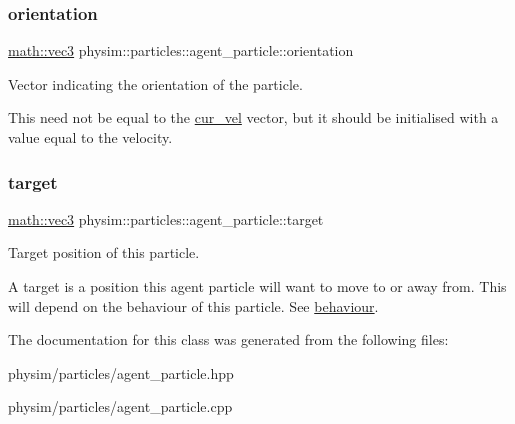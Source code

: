 \subsubsection{\texorpdfstring{orientation}{orientation}}
{\footnotesize\ttfamily \hyperlink{structphysim_1_1math_1_1vec3}{math\+::vec3} physim\+::particles\+::agent\+\_\+particle\+::orientation}



Vector indicating the orientation of the particle. 

This need not be equal to the \hyperlink{classphysim_1_1particles_1_1base__particle_a66a164d2a130c40901e3ec2709cdad43}{cur\+\_\+vel} vector, but it should be initialised with a value equal to the velocity. \mbox{\label{classphysim_1_1particles_1_1agent__particle_a0658207e11a5d39844856233ae8bf2cb}} 
\subsubsection{\texorpdfstring{target}{target}}
{\footnotesize\ttfamily \hyperlink{structphysim_1_1math_1_1vec3}{math\+::vec3} physim\+::particles\+::agent\+\_\+particle\+::target}



Target position of this particle. 

A target is a position this agent particle will want to move to or away from. This will depend on the behaviour of this particle. See \hyperlink{classphysim_1_1particles_1_1agent__particle_af219e3f46630bb7f51f3d00952ed4f1c}{behaviour}. 

The documentation for this class was generated from the following files\+:\begin{DoxyCompactItemize}
\item 
physim/particles/agent\+\_\+particle.\+hpp\item 
physim/particles/agent\+\_\+particle.\+cpp\end{DoxyCompactItemize}
